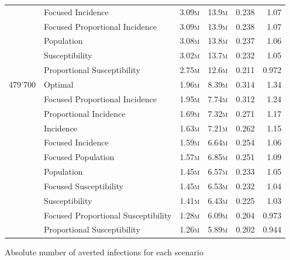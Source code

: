 \begin{fwtable}
\begin{tabular}{llrrrr}
        & Focused Incidence &   3.09\textsc{m}&    13.9\textsc{m}&          0.238 &        1.07 \\
        & Focused Proportional Incidence &   3.09\textsc{m}&    13.9\textsc{m}&          0.238 &        1.07 \\
        & Population &   3.08\textsc{m}&    13.8\textsc{m}&          0.237 &        1.06 \\
        & Susceptibility &   3.02\textsc{m}&    13.7\textsc{m}&          0.232 &        1.05 \\
        & Proportional Susceptibility &   2.75\textsc{m}&    12.6\textsc{m}&          0.211 &       0.972 \\
479'700 & Optimal &   1.96\textsc{m}&    8.39\textsc{m}&          0.314 &        1.34 \\
        & Focused Proportional Incidence &   1.95\textsc{m}&    7.74\textsc{m}&          0.312 &        1.24 \\
        & Proportional Incidence &   1.69\textsc{m}&    7.32\textsc{m}&          0.271 &        1.17 \\
        & Incidence &   1.63\textsc{m}&    7.21\textsc{m}&          0.262 &        1.15 \\
        & Focused Incidence &   1.59\textsc{m}&    6.64\textsc{m}&          0.254 &        1.06 \\
        & Focused Population &   1.57\textsc{m}&    6.85\textsc{m}&          0.251 &        1.09 \\
        & Population &   1.45\textsc{m}&    6.57\textsc{m}&          0.233 &        1.05 \\
        & Focused Susceptibility &   1.45\textsc{m}&    6.53\textsc{m}&          0.232 &        1.04 \\
        & Susceptibility &   1.41\textsc{m}&    6.43\textsc{m}&          0.225 &        1.03 \\
        & Focused Proportional Susceptibility &   1.28\textsc{m}&    6.09\textsc{m}&          0.204 &       0.973 \\
        & Proportional Susceptibility &   1.26\textsc{m}&    5.89\textsc{m}&          0.202 &       0.944 \\
\bottomrule
\end{tabular}
\caption{Absolute number of averted infections for each scenario}
\label{table:all_strat}
\end{fwtable}

